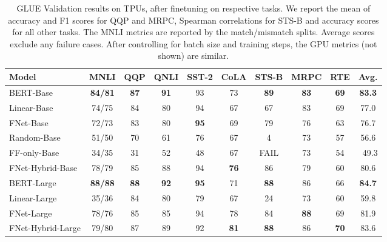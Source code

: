 \documentclass[11pt]{article}
\begin{document}
\begin{table*}[tb]
    \caption{GLUE Validation results on TPUs, after finetuning on respective tasks. We report the mean of accuracy and F1 scores for QQP and MRPC, Spearman correlations for STS-B and accuracy scores for all other tasks. The MNLI metrics are reported by the match/mismatch splits.
    Average scores exclude any failure cases. After controlling for batch size and training steps, the GPU metrics (not shown) are similar.}
    \label{tab:glue}
    \centering
    \begin{tabular}{l| c c c c c c c c | c}
        \hline
         Model  & MNLI & QQP & QNLI & SST-2 & CoLA & STS-B & MRPC & RTE & Avg. \\ \hline \hline
         BERT-Base & \textbf{84/81} & \textbf{87} & \textbf{91} & 93 & 73 & \textbf{89} & \textbf{83} & \textbf{69} & \textbf{83.3} \\
         Linear-Base & 74/75 & 84 & 80 & 94 & 67 & 67 & 83 & 69 & 77.0 \\
         FNet-Base & 72/73 & 83 & 80 & \textbf{95} & 69 & 79 & 76 & 63 & 76.7 \\
         Random-Base & 51/50 & 70 & 61 & 76 & 67 & 4 & 73 & 57 & 56.6 \\
         FF-only-Base & 34/35 & 31 & 52 & 48 & 67 & FAIL & 73 & 54 & \ 49.3 \\ 
         FNet-Hybrid-Base & 78/79 & 85 & 88 & 94 & \textbf{76} & 86 & 79 & 60 & 80.6 \\ \hline
         BERT-Large & \textbf{88/88} & \textbf{88} & \textbf{92} & \textbf{95} & 71 & \textbf{88} & 86 & 66 & \textbf{84.7} \\
         Linear-Large & 35/36 & 84 & 80 & 79 & 67 & 24 & 73 & 60 & 59.8 \\
         FNet-Large & 78/76 & 85 & 85 & 94 & 78 & 84 & \textbf{88} & 69 & 81.9 \\
         FNet-Hybrid-Large & 79/80 & 87 & 89 & 92 & \textbf{81} & \textbf{88} & 86 & \textbf{70} & 83.6 \\ \hline
    \end{tabular}
\end{table*}
\end{document}
